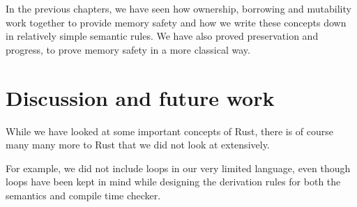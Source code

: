 In the previous chapters, we have seen how ownership, borrowing and mutability work together to provide memory safety and how we write these concepts down in relatively simple semantic rules. We have also proved preservation and progress, to prove memory safety in a more classical way. 

\section{Discussion and future work}
While we have looked at some important concepts of Rust, there is of course many many more to Rust that we did not look at extensively. 

For example, we did not include loops in our very limited language, even though loops have been kept in mind while designing the derivation rules for both the semantics and compile time checker. 
